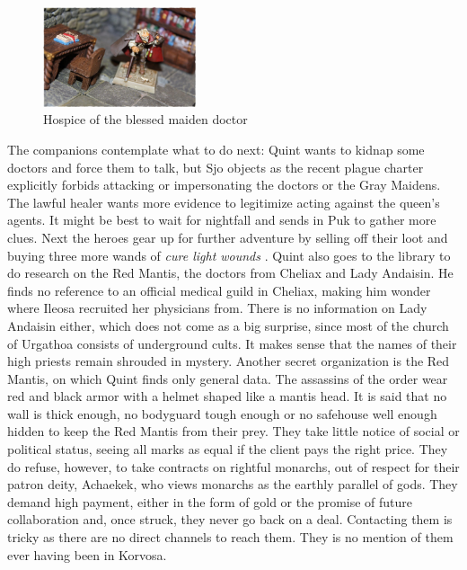 \begin{figure}[h]
	\centering
	\includegraphics[width=0.4\textwidth]{images/Hospice-of-the-blessed-maiden-doctor-515717926_mod.jpg}
	\caption{Hospice of the blessed maiden doctor}
	\label{fig:Hospice-of-the-blessed-maiden-doctor-515717926}
\end{figure}

The companions contemplate what to do next: Quint wants to kidnap some doctors and force them to talk, but Sjo objects as the recent plague charter explicitly forbids attacking or impersonating the doctors or the Gray Maidens. The lawful healer wants more evidence to legitimize acting against the queen's agents. It might be best to wait for nightfall and sends in Puk to gather more clues. Next the heroes gear up for further adventure by selling off their loot and buying three more wands of {\itshape cure light wounds} . Quint also goes to the library to do research on the Red Mantis, the doctors from Cheliax and Lady Andaisin. He finds no reference to an official medical guild in Cheliax, making him wonder where Ileosa recruited her physicians from. There is no information on Lady Andaisin either, which does not come as a big surprise, since most of the church of Urgathoa consists of underground cults. It makes sense that the names of their high priests remain shrouded in mystery. Another secret organization is the Red Mantis, on which Quint finds only general data. The assassins of the order wear red and black armor with a helmet shaped like a mantis head. It is said that no wall is thick enough, no bodyguard tough enough or no safehouse well enough hidden to keep the Red Mantis from their prey. They take little notice of social or political status, seeing all marks as equal if the client pays the right price. They do refuse, however, to take contracts on rightful monarchs, out of respect for their patron deity, Achaekek, who views monarchs as the earthly parallel of gods. They demand high payment, either in the form of gold or the promise of future collaboration and, once struck, they never go back on a deal. Contacting them is tricky as there are no direct channels to reach them. They is no mention of them ever having been in Korvosa.\\

